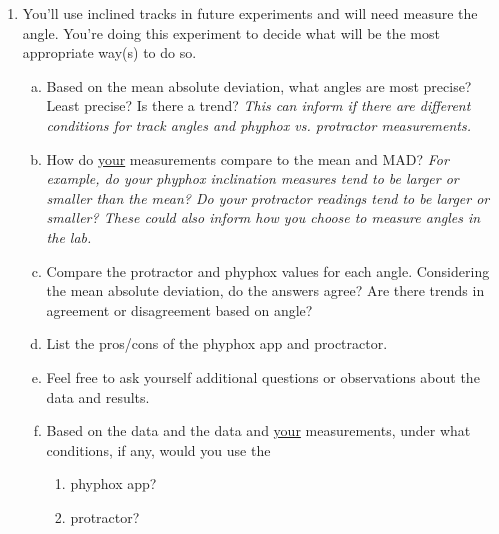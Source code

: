 \documentclass[idxtotoc,hyperref,openany]{labbook} %
\begin{document}
\begin{enumerate}
    \item You’ll use inclined tracks in future experiments and will need measure the angle. You’re doing this experiment to decide what will be the most appropriate way(s) to do so.
    \begin{enumerate}[(a)]
        \item Based on the mean absolute deviation, what angles are most precise? Least precise? Is there a trend? \textit{This can inform if there are different conditions for track angles and phyphox vs. protractor measurements.}
        \item How do \underline{your} measurements compare to the mean and MAD? \textit{For example, do your phyphox inclination measures tend to be larger or smaller than the mean? Do your protractor readings tend to be larger or smaller? These could also inform how you choose to measure angles in the lab.}
        \item Compare the protractor and phyphox values for each angle. Considering the mean absolute deviation, do the answers agree? Are there trends in agreement or disagreement based on angle?
        \item List the pros/cons of the phyphox app and proctractor.
        \item Feel free to ask yourself additional questions or observations about the data and results.
        \item Based on the data and the data and \underline{your} measurements, under what conditions, if any, would you use the
        \begin{enumerate}[i]
            \item phyphox app?
            \item protractor?
        \end{enumerate}
    \end{enumerate}
\end{enumerate}

\end{document}
